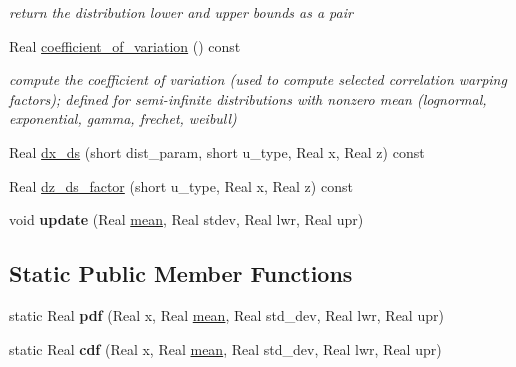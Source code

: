\begin{DoxyCompactItemize}
\begin{DoxyCompactList}\small\item\em return the distribution lower and upper bounds as a pair \end{DoxyCompactList}\item 
Real \hyperlink{classPecos_1_1BoundedNormalRandomVariable_ae1cf1c07047d7ad9dbb899aa01138d54}{coefficient\+\_\+of\+\_\+variation} () const 
\begin{DoxyCompactList}\small\item\em compute the coefficient of variation (used to compute selected correlation warping factors); defined for semi-\/infinite distributions with nonzero mean (lognormal, exponential, gamma, frechet, weibull) \end{DoxyCompactList}\item 
Real \hyperlink{classPecos_1_1BoundedNormalRandomVariable_af889af8adfb262c9b74f573b2a9ffc99}{dx\+\_\+ds} (short dist\+\_\+param, short u\+\_\+type, Real x, Real z) const 
\item 
Real \hyperlink{classPecos_1_1BoundedNormalRandomVariable_af6b5fc528523180bed5fc3008dcea205}{dz\+\_\+ds\+\_\+factor} (short u\+\_\+type, Real x, Real z) const 
\item 
void {\bfseries update} (Real \hyperlink{classPecos_1_1BoundedNormalRandomVariable_a962ffe5a3593be370d5c883365c060f4}{mean}, Real stdev, Real lwr, Real upr)\label{classPecos_1_1BoundedNormalRandomVariable_add81a1f27687971ef4258150d5b35e92}

\end{DoxyCompactItemize}
\subsection*{Static Public Member Functions}
\begin{DoxyCompactItemize}
\item 
static Real {\bfseries pdf} (Real x, Real \hyperlink{classPecos_1_1BoundedNormalRandomVariable_a962ffe5a3593be370d5c883365c060f4}{mean}, Real std\+\_\+dev, Real lwr, Real upr)\label{classPecos_1_1BoundedNormalRandomVariable_ad9ad5dbcbf644f77992c234429589a83}

\item 
static Real {\bfseries cdf} (Real x, Real \hyperlink{classPecos_1_1BoundedNormalRandomVariable_a962ffe5a3593be370d5c883365c060f4}{mean}, Real std\+\_\+dev, Real lwr, Real upr)\label{classPecos_1_1BoundedNormalRandomVariable_aca0dd8dc49fd1def18904463bc0a97f7}

\end{DoxyCompactItemize}
